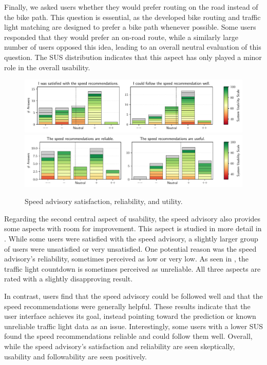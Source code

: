 Finally, we asked users whether they would prefer routing on the road instead of the bike path. This question is essential, as the developed bike routing and traffic light matching are designed to prefer a bike path whenever possible. Some users responded that they would prefer an on-road route, while a similarly large number of users opposed this idea, leading to an overall neutral evaluation of this question. The SUS distribution indicates that this aspect has only played a minor role in the overall usability.

\begin{figure}[t]
\caption{Speed advisory satisfaction, reliability, and utility.}\label{fig:speed-recommendations-satisfaction}
\includegraphics[width=\linewidth]{images/app-usability-questions-speed-recommendations-satisfaction.pdf}
\\
\includegraphics[width=\linewidth]{images/app-usability-questions-speed-recommendations-reliability.pdf}
\end{figure}

Regarding the second central aspect of usability, the speed advisory also provides some aspects with room for improvement. This aspect is studied in more detail in . While some users were satisfied with the speed advisory, a slightly larger group of users were unsatisfied or very unsatisfied. One potential reason was the speed advisory's reliability, sometimes perceived as low or very low. As seen in  , the traffic light countdown is sometimes perceived as unreliable. All three aspects are rated with a slightly disapproving result.

In contrast, users find that the speed advisory could be followed well and that the speed recommendations were generally helpful. These results indicate that the user interface achieves its goal, instead pointing toward the prediction or known unreliable traffic light data as an issue. Interestingly, some users with a lower SUS found the speed recommendations reliable and could follow them well. Overall, while the speed advisory's satisfaction and reliability are seen skeptically, usability and followability are seen positively.

